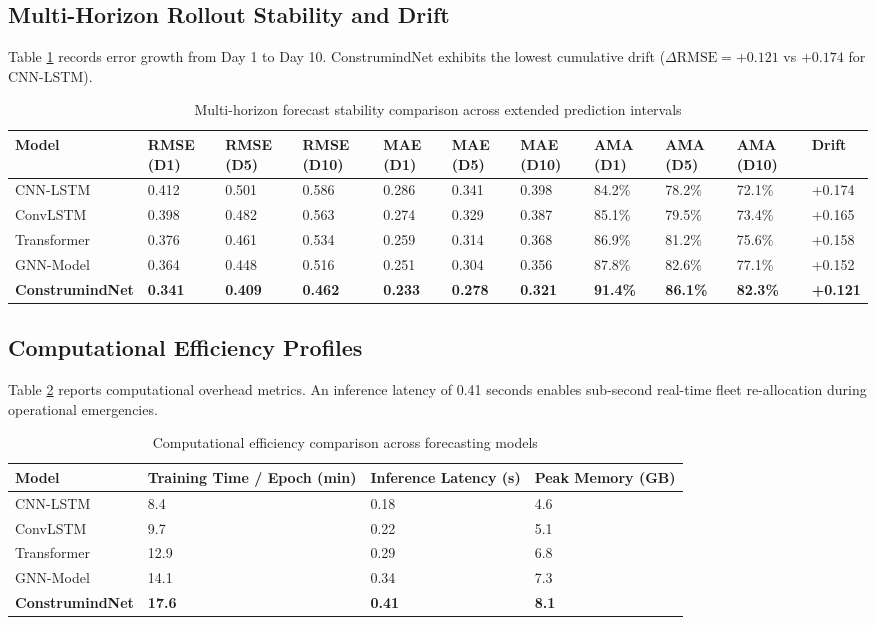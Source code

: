 \documentclass[11pt,a4paper]{article}
\begin{document}
\subsection{Multi-Horizon Rollout Stability and Drift}
Table \ref{tab:drift} records error growth from Day 1 to Day 10. ConstrumindNet exhibits the lowest cumulative drift ($\Delta\text{RMSE} = +0.121$ vs $+0.174$ for CNN-LSTM).

\begin{table}[t]
\centering
\small
\caption{Multi-horizon forecast stability comparison across extended prediction intervals}\label{tab:drift}
\begin{tabular*}{\textwidth}{@{\extracolsep\fill}lllllllllll@{\extracolsep\fill}}
\toprule
\textbf{Model} & \textbf{RMSE (D1)} & \textbf{RMSE (D5)} & \textbf{RMSE (D10)} & \textbf{MAE (D1)} & \textbf{MAE (D5)} & \textbf{MAE (D10)} & \textbf{AMA (D1)} & \textbf{AMA (D5)} & \textbf{AMA (D10)} & \textbf{Drift} \\
\midrule
CNN-LSTM & 0.412 & 0.501 & 0.586 & 0.286 & 0.341 & 0.398 & 84.2\% & 78.2\% & 72.1\% & +0.174 \\
ConvLSTM & 0.398 & 0.482 & 0.563 & 0.274 & 0.329 & 0.387 & 85.1\% & 79.5\% & 73.4\% & +0.165 \\
Transformer & 0.376 & 0.461 & 0.534 & 0.259 & 0.314 & 0.368 & 86.9\% & 81.2\% & 75.6\% & +0.158 \\
GNN-Model & 0.364 & 0.448 & 0.516 & 0.251 & 0.304 & 0.356 & 87.8\% & 82.6\% & 77.1\% & +0.152 \\
\midrule
\textbf{ConstrumindNet} & \textbf{0.341} & \textbf{0.409} & \textbf{0.462} & \textbf{0.233} & \textbf{0.278} & \textbf{0.321} & \textbf{91.4\%} & \textbf{86.1\%} & \textbf{82.3\%} & \textbf{+0.121} \\
\bottomrule
\end{tabular*}
\end{table}

\subsection{Computational Efficiency Profiles}
Table \ref{tab:comp} reports computational overhead metrics. An inference latency of 0.41 seconds enables sub-second real-time fleet re-allocation during operational emergencies.

\begin{table}[h]
\centering
\small
\caption{Computational efficiency comparison across forecasting models}\label{tab:comp}
\begin{tabular}{@{}llll@{}}
\toprule
\textbf{Model} & \textbf{Training Time / Epoch (min)} & \textbf{Inference Latency (s)} & \textbf{Peak Memory (GB)} \\
\midrule
CNN-LSTM & 8.4 & 0.18 & 4.6 \\
ConvLSTM & 9.7 & 0.22 & 5.1 \\
Transformer & 12.9 & 0.29 & 6.8 \\
GNN-Model & 14.1 & 0.34 & 7.3 \\
\midrule
\textbf{ConstrumindNet} & \textbf{17.6} & \textbf{0.41} & \textbf{8.1} \\
\bottomrule
\end{tabular}
\end{table}
\end{document}
